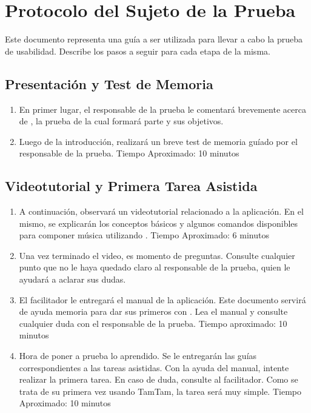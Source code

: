 \section{Protocolo del Sujeto de la Prueba}

Este documento representa una gu\'ia a ser utilizada para llevar a cabo la prueba de usabilidad. 
Describe los pasos a seguir para cada etapa de la misma.

\subsection{Presentaci\'on y Test de Memoria}

\begin{enumerate}
    \item En primer lugar, el responsable de la prueba le comentar\'a brevemente acerca de 
    , la prueba de la cual formar\'a parte y sus objetivos.
    \item Luego de la introducci\'on, realizar\'a un breve test de memoria gu\'iado por el responsable de la prueba. Tiempo Aproximado: 10 minutos
    \setcounter{enumTemp}{\theenumi}
\end{enumerate}

\subsection{Videotutorial y Primera Tarea Asistida}
\begin{enumerate}
    \setcounter{enumi}{\theenumTemp}
    \item A continuaci\'on, observar\'a un videotutorial relacionado a la aplicaci\'on. En el mismo, se
     explicar\'an los conceptos b\'asicos y algunos comandos disponibles para componer m\'usica utilizando 
    . 
    Tiempo Aproximado: 6 minutos
    \item Una vez terminado el video, es momento de preguntas. Consulte cualquier punto que no le haya quedado claro al responsable de la prueba, quien le ayudar\'a a aclarar sus dudas.
    \item El facilitador le entregar\'a el manual de la aplicaci\'on. Este documento servir\'a de ayuda memoria para dar sus primeros con . Lea el manual y consulte cualquier duda con el responsable de la prueba.
        Tiempo aproximado: 10 minutos
    \item Hora de poner a prueba lo aprendido. Se le entregar\'an las gu\'ias correspondientes a las tareas asistidas. Con la ayuda del manual, intente realizar la primera tarea. En caso de duda, consulte al facilitador. Como se trata de su primera vez usando TamTam, la tarea ser\'a muy simple.
    Tiempo Aproximado: 10 minutos
    \setcounter{enumTemp}{\theenumi}
\end{enumerate}

